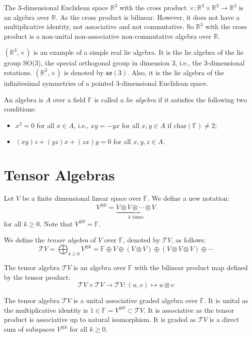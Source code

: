 \documentclass[
	11pt, %
	fleqn, %
	a4paper, %
]{LegrandOrangeBook}
\newcommand{\F}{\mathbb{F}} %
\newcommand{\R}{\mathbb{R}} %
\newcommand{\T}{\mathcal{T}} %
\begin{document}
\begin{example}
    The 3-dimensional Euclidean space $\R^3$ with the cross product $\times : \R^3 \times \R^3 \to \R^3$ is an algebra over $\R$. As the cross product is bilinear. However, it does not have a multiplicative identity, not associative and not commutative. So $\R^3$ with the cross product is a non-unital non-associative non-commutative algebra over $\R$.
\end{example}

\begin{remark}
    $(\R^3, \times)$ is an example of a simple real lie algebra. It is the lie algebra of the lie group SO(3), the special orthogonal group in dimension 3, i.e., the 3-dimensional rotations. $(\R^3, \times)$ is denoted by $\mathfrak{so}(3)$. Also, it is the lie algebra of the infinitesimal symmetries of a pointed 3-dimensional Euclidean space. 
\end{remark}

\begin{definition}
    An algebra is $A$ over a field $\F$ is called a \emph{lie algebra} if it satisfies the following two conditions:
    \begin{itemize}
        \item $x^2 = 0$ for all $x \in A$, i.e., $xy = -yx$ for all $x, y \in A$ if $\text{char}(\F) \neq 2$;
        \item $(xy)z + (yz)x + (zx)y = 0$ for all $x, y, z \in A$.
    \end{itemize}
\end{definition}

\newpage

\section{Tensor Algebras}

Let $V$ be a finite dimensional linear space over $\F$. We define a new notation:
\[
    V^{\otimes k} = \underbrace{V \otimes V \otimes \cdots \otimes V}_{k \text{ times}}
\]
for all $k \geq 0$. Note that $V^{\otimes 0} = \F$.

We define the \emph{tensor algebra} of $V$ over $\F$, denoted by $\T V$, as follows:
\[
    \T V = \bigoplus_{k \geq 0} V^{\otimes k} = \F \oplus V \oplus (V \otimes V) \oplus (V \otimes V \otimes V) \oplus \cdots
\]

The tensor algebra $\T V$ is an algebra over $\F$ with the bilinear product map defined by the tensor product:
\[
    \T V \times \T V \to \T V : (u, v) \mapsto u \otimes v
\]

\begin{remark}
    The tensor algebra $\T V$ is a unital associative graded algebra over $\F$. It is unital as the multiplicative identity is $1 \in \F = V^{\otimes 0} \subset \T V$. It is associative as the tensor product is associative up to natural isomorphism. It is graded as $\T V$ is a direct sum of subspaces $V^{\otimes k}$ for all $k \geq 0$.
\end{remark}

\end{document}
